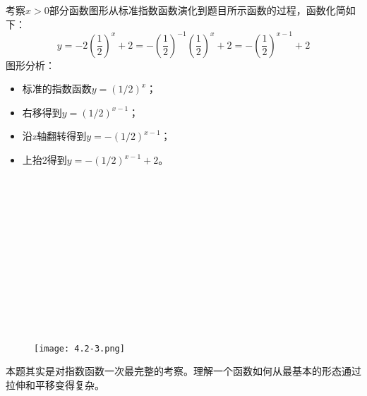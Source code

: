 考察$x>0$部分函数图形从标准指数函数演化到题目所示函数的过程，函数化简如下：
\[
y=-2\left( \frac{1}{2} \right) ^x+2=-\left( \frac{1}{2} \right) ^{-1}\left( \frac{1}{2} \right) ^x+2=-\left( \frac{1}{2} \right) ^{x-1}+2
\]
图形分析：
\begin{itemize}
    \item 标准的指数函数$y=\left( 1/2 \right) ^x$；
    \item 右移得到$y=\left( 1/2 \right) ^{x-1}$；
    \item 沿{\it x}轴翻转得到$y=-\left( 1/2 \right) ^{x-1}$；
    \item 上抬2得到$y=-\left( 1/2 \right) ^{x-1}+2$。
\end{itemize}

~

~

~

~

~

~

~

\begin{figure}[ht]
\centering
\texttt{[image: 4.2-3.png]}
\end{figure}

\begin{tcolorbox}
本题其实是对指数函数一次最完整的考察。理解一个函数如何从最基本的形态通过拉伸和平移变得复杂。
\end{tcolorbox}




